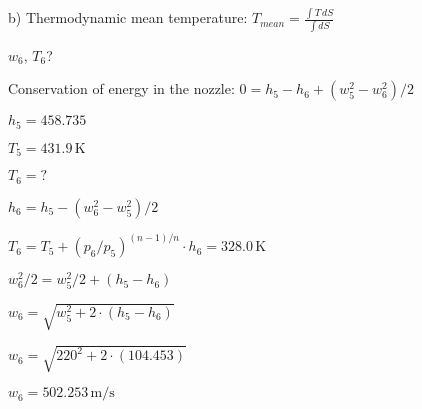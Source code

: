 b) Thermodynamic mean temperature:  
\( T_{mean} = \frac{\int T \, dS}{\int dS} \)

\( w_6 \), \( T_6 \)?  

Conservation of energy in the nozzle:  
\( 0 = h_5 - h_6 + (w_5^2 - w_6^2) / 2 \)  

\( h_5 = 458.735 \)  

\( T_5 = 431.9 \, \text{K} \)  

\( T_6 = ? \)  

\( h_6 = h_5 - (w_6^2 - w_5^2) / 2 \)  

\( T_6 = T_5 + (p_6 / p_5)^{(n-1)/n} \cdot h_6 = 328.0 \, \text{K} \)  

\( w_6^2 / 2 = w_5^2 / 2 + (h_5 - h_6) \)  

\( w_6 = \sqrt{w_5^2 + 2 \cdot (h_5 - h_6)} \)  

\( w_6 = \sqrt{220^2 + 2 \cdot (104.453)} \)  

\( w_6 = 502.253 \, \text{m/s} \)